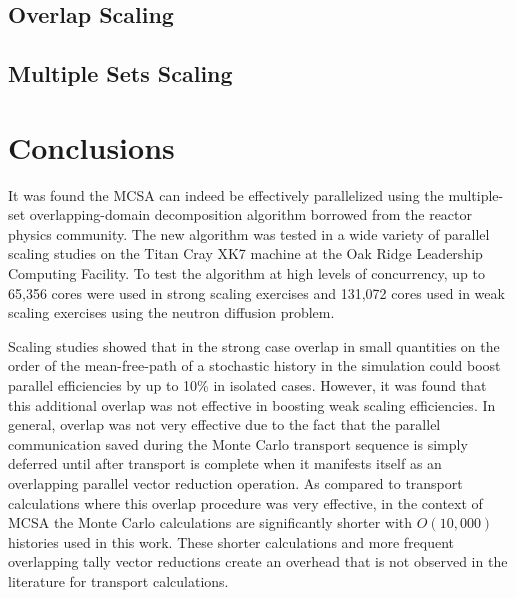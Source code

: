 \documentclass{snamc2013}
\begin{document}
\subsection{Overlap Scaling}

\subsection{Multiple Sets Scaling}

\section{Conclusions}

It was found the MCSA can indeed be effectively parallelized using the
multiple-set overlapping-domain decomposition algorithm borrowed from
the reactor physics community.  The new algorithm was tested in a wide
variety of parallel scaling studies on the Titan Cray XK7 machine at
the Oak Ridge Leadership Computing Facility. To test the algorithm at
high levels of concurrency, up to 65,356 cores were used in strong
scaling exercises and 131,072 cores used in weak scaling exercises
using the neutron diffusion problem.

Scaling studies showed that in the strong case overlap in small
quantities on the order of the mean-free-path of a stochastic history
in the simulation could boost parallel efficiencies by up to 10\% in
isolated cases. However, it was found that this additional overlap was
not effective in boosting weak scaling efficiencies. In general,
overlap was not very effective due to the fact that the parallel
communication saved during the Monte Carlo transport sequence is
simply deferred until after transport is complete when it manifests
itself as an overlapping parallel vector reduction operation. As
compared to transport calculations where this overlap procedure was
very effective, in the context of MCSA the Monte Carlo calculations
are significantly shorter with $O(10,000)$ histories used in this
work. These shorter calculations and more frequent overlapping tally
vector reductions create an overhead that is not observed in the
literature for transport calculations.
\end{document}
